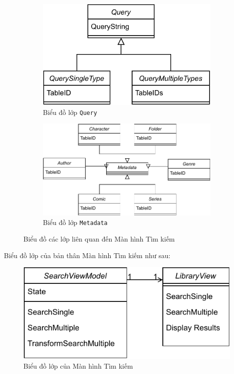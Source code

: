 \documentclass[../../../../thesis]{subfiles}
\begin{document}
\begin{figure}[H]
    \centering
    \begin{subfigure}[b]{0.36\textwidth}
        \centering
        \includegraphics[scale=0.75]{../images/query_class.pdf}
        \caption{Biểu đồ lớp \texttt{Query}}
    \end{subfigure}
    \begin{subfigure}[b]{0.63\textwidth}
        \centering
        \includegraphics[scale=0.75]{../images/metadata_class.pdf}
        \caption{Biểu đồ lớp \texttt{Metadata}}
    \end{subfigure}
    \caption{Biểu đồ các lớp liên quan đến Màn hình Tìm kiếm}
    \label{fig:graph-related-class}
\end{figure}

Biểu đồ lớp của bản thân Màn hình Tìm kiếm như sau:

\begin{figure}[H]
    \centering
    \includegraphics[scale=0.85]{../images/search_mvvm_class.pdf}
    \caption{Biểu đồ lớp của Màn hình Tìm kiếm}
    \label{fig:search_mvvm_class}
\end{figure}
\end{document}
